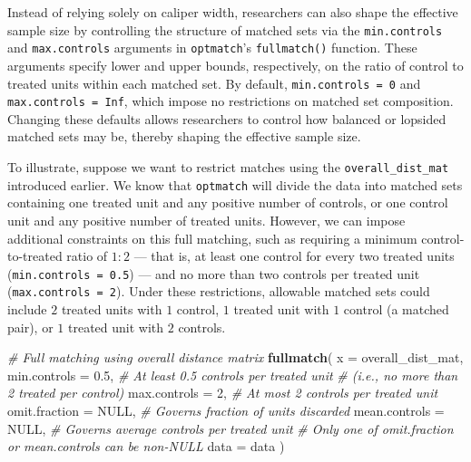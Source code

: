 \documentclass[
  12pt,
  leqno]{article}
\newenvironment{Shaded}{\begin{snugshade}}{\end{snugshade}}
\newcommand{\AttributeTok}[1]{\textcolor[rgb]{0.13,0.29,0.53}{#1}}
\newcommand{\CommentTok}[1]{\textcolor[rgb]{0.56,0.35,0.01}{\textit{#1}}}
\newcommand{\ConstantTok}[1]{\textcolor[rgb]{0.56,0.35,0.01}{#1}}
\newcommand{\DecValTok}[1]{\textcolor[rgb]{0.00,0.00,0.81}{#1}}
\newcommand{\FloatTok}[1]{\textcolor[rgb]{0.00,0.00,0.81}{#1}}
\newcommand{\FunctionTok}[1]{\textcolor[rgb]{0.13,0.29,0.53}{\textbf{#1}}}
\newcommand{\NormalTok}[1]{#1}
\begin{document}
Instead of relying solely on caliper width, researchers can also shape
the effective sample size by controlling the structure of matched sets
via the \texttt{min.controls} and \texttt{max.controls} arguments in
\texttt{optmatch}'s \texttt{fullmatch()} function. These arguments
specify lower and upper bounds, respectively, on the ratio of control to
treated units within each matched set. By default,
\texttt{min.controls\ =\ 0} and \texttt{max.controls\ =\ Inf}, which
impose no restrictions on matched set composition. Changing these
defaults allows researchers to control how balanced or lopsided matched
sets may be, thereby shaping the effective sample size.

To illustrate, suppose we want to restrict matches using the
\texttt{overall\_dist\_mat} introduced earlier. We know that
\texttt{optmatch} will divide the data into matched sets containing one
treated unit and any positive number of controls, or one control unit
and any positive number of treated units. However, we can impose
additional constraints on this full matching, such as requiring a
minimum control-to-treated ratio of \(1{:}2\) --- that is, at least one
control for every two treated units (\texttt{min.controls\ =\ 0.5}) ---
and no more than two controls per treated unit
(\texttt{max.controls\ =\ 2}). Under these restrictions, allowable
matched sets could include \(2\) treated units with \(1\) control, \(1\)
treated unit with \(1\) control (a matched pair), or \(1\) treated unit
with \(2\) controls.

\singlespacing

\begin{Shaded}
\begin{Highlighting}[]
\CommentTok{\# Full matching using overall distance matrix}
\FunctionTok{fullmatch}\NormalTok{(}
  \AttributeTok{x =}\NormalTok{ overall\_dist\_mat,}
  \AttributeTok{min.controls =} \FloatTok{0.5}\NormalTok{,   }\CommentTok{\# At least 0.5 controls per treated unit}
                        \CommentTok{\# (i.e., no more than 2 treated per control)}
  \AttributeTok{max.controls =} \DecValTok{2}\NormalTok{,     }\CommentTok{\# At most 2 controls per treated unit}
  \AttributeTok{omit.fraction =} \ConstantTok{NULL}\NormalTok{, }\CommentTok{\# Governs fraction of units discarded}
  \AttributeTok{mean.controls =} \ConstantTok{NULL}\NormalTok{, }\CommentTok{\# Governs average controls per treated unit}
  \CommentTok{\# Only one of omit.fraction or mean.controls can be non{-}NULL}
  \AttributeTok{data =}\NormalTok{ data}
\NormalTok{)}
\end{Highlighting}
\end{Shaded}
\end{document}
